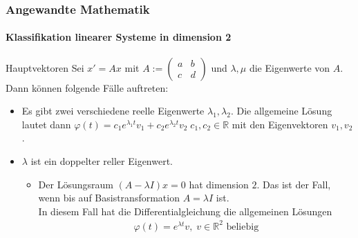 \documentclass{beamer}
\begin{document}
\begin{frame}
    \frametitle{Angewandte Mathematik}
\framesubtitle{Klassifikation linearer Systeme in dimension 2}
\begin{block}{Hauptvektoren}
Sei $x' = Ax$ mit $A:=\begin{pmatrix} a & b \\ c & d \end{pmatrix}$ und $\lambda, \mu$ die Eigenwerte von $A$.
Dann können folgende Fälle auftreten:
\begin{itemize}
  \item   Es gibt zwei verschiedene reelle Eigenwerte $\lambda_1, \lambda_2$. Die allgemeine Lösung lautet dann
	    $\varphi(t) = c_1 e^{\lambda_1 t} v_1 +c_2 e^{\lambda_2 t} v_2 \; c_1, c_2 \in \mathbb{R}$	mit den Eigenvektoren $v_1, v_2$.
    \item $\lambda$ ist ein doppelter reller Eigenwert.
        \begin{itemize}
            \item Der Lösungsraum $(A - \lambda I)x = 0$ hat dimension $2$. Das ist der Fall,
                wenn bis auf Basistransformation $A = \lambda I$ ist. \\
                In diesem Fall hat die Differentialgleichung die allgemeinen Lösungen 
                \begin{align*}
                    \varphi(t) = e^{\lambda t}v, \; v \in \mathbb{R}^2 \text{ beliebig}
                \end{align*}
            \end{itemize}

\end{itemize}

\end{block}

\end{frame}
\end{document}

